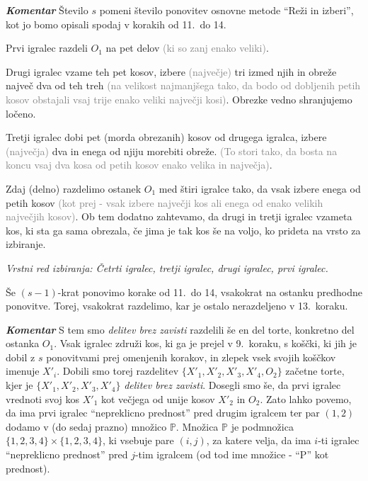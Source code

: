 \documentclass[a4paper,12pt]{article}
\def\P{\mathbb{P}}
\begin{document}
\begin{protokol}
\item [\textbf{\em Komentar}] Število $s$ pomeni število ponovitev osnovne metode ``Reži in izberi'', kot jo bomo opisali spodaj v korakih od 11.~do 14.


\item Prvi igralec razdeli $O_1$ na pet delov \textcolor{gray}{(ki so zanj enako veliki)}.

\item Drugi igralec vzame teh pet kosov, izbere \textcolor{gray}{(največje)} tri izmed njih in obreže največ dva od teh treh \textcolor{gray}{(na velikost najmanjšega tako, da bodo od dobljenih petih kosov obstajali vsaj trije enako veliki največji kosi)}. Obrezke vedno shranjujemo ločeno.

\item Tretji igralec dobi pet (morda obrezanih) kosov od drugega igralca, izbere \textcolor{gray}{(največja)} dva in enega od njiju morebiti obreže. \textcolor{gray}{(To stori tako, da bosta na koncu vsaj dva kosa od petih kosov enako velika in največja)}.

\item Zdaj (delno) razdelimo ostanek $O_1$ med štiri igralce tako, da vsak izbere enega od petih kosov \textcolor{gray}{(kot prej - vsak izbere največji kos ali enega od enako velikih največjih kosov)}. Ob tem dodatno zahtevamo, da drugi in tretji igralec vzameta kos, ki sta ga sama obrezala, če jima je tak kos še na voljo, ko prideta na vrsto za izbiranje.

\textsl{Vrstni red izbiranja: Četrti igralec, tretji igralec, drugi igralec, prvi igralec.}

\item Še $(s - 1)$-krat ponovimo korake od 11.~do 14, vsakokrat na ostanku predhodne ponovitve. Torej, vsakokrat razdelimo, kar je ostalo nerazdeljeno v 13.~koraku.

\item [\textbf{\em Komentar}]  S tem smo {\em delitev brez zavisti} razdelili še en del torte, konkretno del ostanka $O_1$. Vsak igralec združi kos, ki ga je prejel v 9.~koraku, s koščki, ki jih je dobil z $s$ ponovitvami prej omenjenih korakov, in zlepek vsek svojih koščkov imenuje $X'_i$. Dobili smo torej razdelitev ${\{X'_1, X'_2, X'_3, X'_4, O_2\}}$ začetne torte, kjer je ${\{X'_1, X'_2, X'_3, X'_4\}}$ {\em delitev brez zavisti}. Dosegli smo še, da prvi igralec vrednoti svoj kos $X'_1$ kot večjega od unije kosov $X'_2$ in $O_2$. Zato lahko povemo, da ima prvi igralec ``nepreklicno prednost'' pred drugim igralcem ter par $(1,2)$ dodamo v (do sedaj prazno) množico $\P$. Množica $\P$ je podmnožica ${\{1, 2, 3, 4\}} \times {\{1, 2, 3, 4\}}$, ki vsebuje pare $(i, j)$, za katere velja, da ima $i$-ti igralec ``nepreklicno prednost'' pred $j$-tim igralcem (od tod ime množice - ``P'' kot prednost).


\end{protokol}
\end{document}
